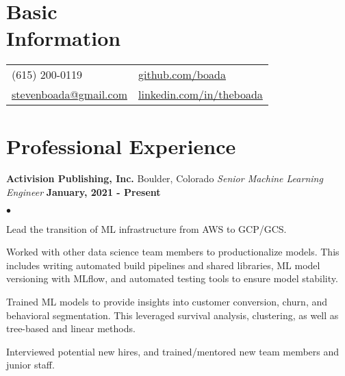 \documentclass[margin,line, 11pt]{res}
\newenvironment{list2}{
  \begin{list}{$\bullet$}{%
      \setlength{\itemsep}{0in}
      \setlength{\parsep}{0in} \setlength{\parskip}{0in}
      \setlength{\topsep}{0in} \setlength{\partopsep}{0in}
      \setlength{\leftmargin}{0.2in}}}{\end{list}}
\begin{document}

\begin{resume}
\vspace*{-2mm}
\section{Basic\\Information}
\begin{tabular}{@{}p{4.9in}p{4in}}
  (615) 200-0119 & \href{https://github.com/boada}{github.com/boada} \\
  \href{mailto:stevenboada@gmail.com}{stevenboada@gmail.com} & \href{https://linkedin.com/in/theboada}{linkedin.com/in/theboada} \\
\end{tabular}


\section{Professional \newline Experience}
\textbf{Activision Publishing, Inc.} \hfill Boulder, Colorado\newline
\textit{Senior Machine Learning Engineer} \hfill \textbf{January, 2021 - Present}\newline
    \begin{list2}
    	\vspace*{-5mm}
      \item Lead the transition of ML infrastructure from AWS to GCP/GCS.
      \item Worked with other data science team members to productionalize models. This includes writing automated build pipelines and shared libraries, ML model versioning with MLflow, and automated testing tools to ensure model stability.
      \item Trained ML models to provide insights into customer conversion, churn, and behavioral segmentation. This leveraged survival analysis, clustering, as well as tree-based and linear methods.
      \item Interviewed potential new hires, and trained/mentored new team members and junior staff.
    \end{list2}
\vspace*{-2mm}


\end{resume}
\end{document}
